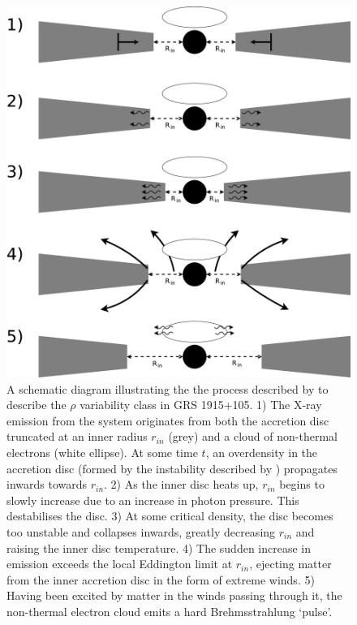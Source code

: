 \pagebreak
\begin{figure}
  \centering
  \includegraphics[width=.9\linewidth, trim= 25mm 0mm 0mm 0mm]{images/Wind_Model1.eps}
  \caption{\small A schematic diagram illustrating the the process described by \citet{Neilsen_GRSModel} to describe the $\rho$ variability class in GRS 1915+105.  1) The X-ray emission from the system originates from both the accretion disc truncated at an inner radius $r_{in}$ (grey) and a cloud of non-thermal electrons (white ellipse).  At some time $t$, an overdensity in the accretion disc (formed by the instability described by \citet{Shakura_Instab}) propagates inwards towards $r_{in}$.  2) As the inner disc heats up, $r_{in}$ begins to slowly increase due to an increase in photon pressure.  This destabilises the disc.  3) At some critical density, the disc becomes too unstable and collapses inwards, greatly decreasing $r_{in}$ and raising the inner disc temperature.  4) The sudden increase in emission exceeds the local Eddington limit at $r_{in}$, ejecting matter from the inner accretion disc in the form of extreme winds.  5) Having been excited by matter in the winds passing through it, the non-thermal electron cloud emits a hard Brehmsstrahlung `pulse'.}
  \label{fig:WindsModel}
\end{figure}
\pagebreak

